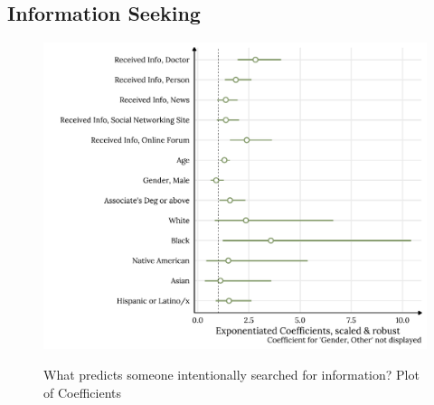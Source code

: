\hypertarget{information seeking}{\subsection{Information Seeking}\label{information seeking}}



\begin{figure}[h]
{\centering \includegraphics[width=0.8\linewidth]{figs/paper2/plot-model-1-1}}
\caption{What predicts someone intentionally searched for information? Plot of Coefficients}\label{fig:plot-model-1}
\end{figure}

